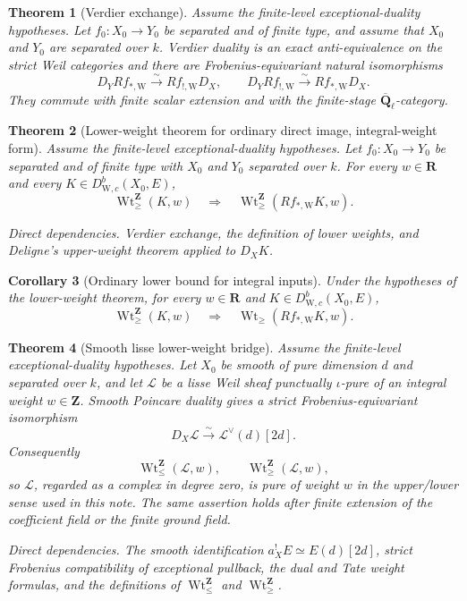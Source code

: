 \documentclass[10pt]{article}
\newtheorem{theorem}{Theorem}[section]
\newtheorem{corollary}[theorem]{Corollary}
\theoremstyle{definition}
\newcommand{\Qlb}{\overline{\mathbf Q}_\ell}
\newcommand{\DW}{D^b_{\mathrm W,c}}
\newcommand{\WtGe}{\operatorname{Wt}_{\geq}}
\newcommand{\IntWtLe}{\operatorname{Wt}^{\mathbf Z}_{\leq}}
\newcommand{\IntWtGe}{\operatorname{Wt}^{\mathbf Z}_{\geq}}
\newcommand{\dep}[1]{\par\smallskip\noindent\textit{Direct dependencies.} #1\par}
\begin{document}
\begin{theorem}[Verdier exchange]
Assume the finite-level exceptional-duality hypotheses.  Let
\(f_0:X_0\to Y_0\) be separated and of finite type, and assume that
\(X_0\) and \(Y_0\) are separated over \(k\).  Verdier duality is an
exact anti-equivalence on the strict Weil categories and there are
Frobenius-equivariant natural isomorphisms
\[
 D_YRf_{*,\mathrm W}\xrightarrow{\sim}Rf_{!,\mathrm W}D_X,
 \qquad
 D_YRf_{!,\mathrm W}\xrightarrow{\sim}Rf_{*,\mathrm W}D_X.
\]
They commute with finite scalar extension and with the finite-stage
\(\Qlb\)-category.
\end{theorem}

\begin{theorem}[Lower-weight theorem for ordinary direct image,
integral-weight form]
Assume the finite-level exceptional-duality hypotheses.  Let
\(f_0:X_0\to Y_0\) be separated and of finite type with \(X_0\) and
\(Y_0\) separated over \(k\).  For every \(w\in\mathbf R\) and every
\(K\in\DW(X_0,E)\),
\[
 \boxed{\qquad
       \IntWtGe(K,w)\quad\Longrightarrow\quad
       \IntWtGe(Rf_{*,\mathrm W}K,w).
 \qquad}
\]
\dep{Verdier exchange, the definition of lower weights, and Deligne's
upper-weight theorem applied to \(D_XK\).}
\end{theorem}

\begin{corollary}[Ordinary lower bound for integral inputs]
Under the hypotheses of the lower-weight theorem, for every
\(w\in\mathbf R\) and \(K\in\DW(X_0,E)\),
\[
          \IntWtGe(K,w)\quad\Longrightarrow\quad
          \WtGe(Rf_{*,\mathrm W}K,w).
\]
\end{corollary}

\begin{theorem}[Smooth lisse lower-weight bridge]
Assume the finite-level exceptional-duality hypotheses.  Let \(X_0\) be
smooth of pure dimension \(d\) and separated over \(k\), and let
\(\mathcal L\) be a lisse Weil sheaf punctually \(\iota\)-pure of an
integral weight \(w\in\mathbf Z\).  Smooth Poincare duality gives a strict
Frobenius-equivariant isomorphism
\[
                 D_X\mathcal L\xrightarrow{\sim}
                 \mathcal L^\vee(d)[2d].
\]
Consequently
\[
             \IntWtLe(\mathcal L,w),\qquad
             \IntWtGe(\mathcal L,w),
\]
so \(\mathcal L\), regarded as a complex in degree zero, is pure of weight
\(w\) in the upper/lower sense used in this note.  The same assertion holds
after finite extension of the coefficient field or the finite ground
field.
\dep{The smooth identification \(a_X^!E\simeq E(d)[2d]\), strict
Frobenius compatibility of exceptional pullback, the dual and Tate weight
formulas, and the definitions of \(\IntWtLe\) and \(\IntWtGe\).}
\end{theorem}
\end{document}
